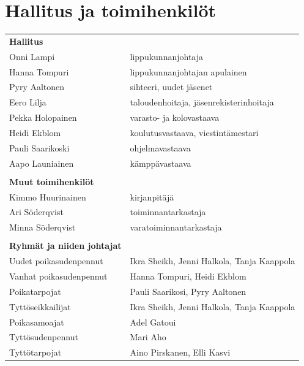 \documentclass[a4paper, 12pt, finnish]{report} %
\begin{document}
\section{Hallitus ja toimihenkilöt}
\begin{center}
	\begin{tabular}{ l l }
		\textbf{Hallitus} & \\
		Onni Lampi & lippukunnanjohtaja\\
		Hanna Tompuri & lippukunnanjohtajan apulainen\\
		Pyry Aaltonen & sihteeri, uudet jäsenet\\
		Eero Lilja & taloudenhoitaja, jäsenrekisterinhoitaja\\
		Pekka Holopainen & varasto- ja kolovastaava\\
		Heidi Ekblom & koulutusvastaava, viestintämestari\\
		Pauli Saarikoski & ohjelmavastaava\\
		Aapo Launiainen & kämppävastaava\\
						     & \\
		\textbf{Muut toimihenkilöt} & \\
		Kimmo Huurinainen & kirjanpitäjä\\
		Ari Söderqvist & toiminnantarkastaja\\
		Minna Söderqvist & varatoiminnantarkastaja\\
							      & \\
		\textbf{Ryhmät ja niiden johtajat} & \\
		Uudet poikasudenpennut & Ikra Sheikh, Jenni Halkola, Tanja Kaappola\\
		Vanhat poikasudenpennut & Hanna Tompuri, Heidi Ekblom\\
		Poikatarpojat & Pauli Saarikosi, Pyry Aaltonen\\
		Tyttöseikkailijat & Ikra Sheikh, Jenni Halkola, Tanja Kaappola\\
		Poikasamoajat & Adel Gatoui\\
		Tyttösudenpennut & Mari Aho\\
		Tyttötarpojat & Aino Pirskanen, Elli Kasvi\\
	\end{tabular}
\end{center}

\newpage
\end{document}
